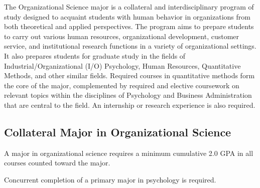 \documentclass[
  letterpaper,
]{scrbook}
\begin{document}
The Organizational Science major is a collateral and interdisciplinary
program of study designed to acquaint students with human behavior in
organizations from both theoretical and applied perspectives. The
program aims to prepare students to carry out various human resources,
organizational development, customer service, and institutional research
functions in a variety of organizational settings. It also prepares
students for graduate study in the fields of Industrial/Organizational
(I/O) Psychology, Human Resources, Quantitative Methods, and other
similar fields. Required courses in quantitative methods form the core
of the major, complemented by required and elective coursework on
relevant topics within the disciplines of Psychology and Business
Administration that are central to the field. An internship or research
experience is also required.

\subsection{Collateral Major in Organizational
Science}\label{collateral-major-in-organizational-science}

A major in organizational science requires a minimum cumulative 2.0 GPA
in all courses counted toward the major.

Concurrent completion of a primary major in psychology is required.
\end{document}
